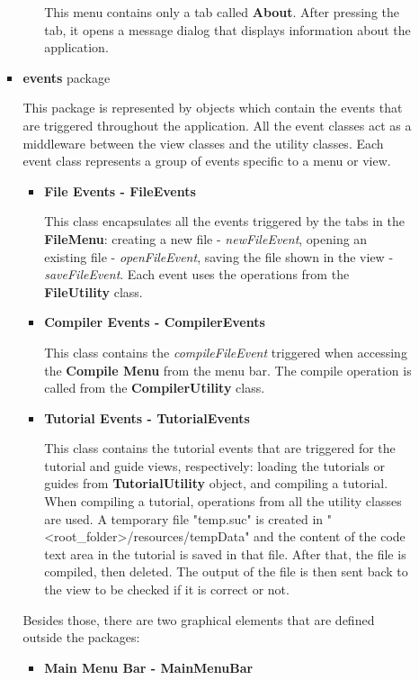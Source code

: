 \documentclass[12pt,a4paper,twoside]{report}
\begin{document}
\begin{enumerate}
\begin{itemize}
\begin{itemize}
\begin{enumerate}
	This menu contains only a tab called \textbf{About}. After pressing the tab, it opens a message dialog that displays information about the application.
	\end{enumerate}
	
	\item \textbf{events} package
	
	This package is represented by objects which contain the events that are triggered throughout the application. All the event classes act as a middleware between the view classes and the utility classes. Each event class represents a group of events specific to a menu or view.
	
	\begin{itemize}
		\item \textbf{File Events - FileEvents}
		
		This class encapsulates all the events triggered by the tabs in the \textbf{FileMenu}: creating a new file - \textit{newFileEvent}, opening an existing file - \textit{openFileEvent}, saving the file shown in the view - \textit{saveFileEvent}. Each event uses the operations from the \textbf{FileUtility} class. 
		
		\item \textbf{Compiler Events - CompilerEvents}
		
		This class contains the \textit{compileFileEvent} triggered when accessing the \textbf{Compile Menu} from the menu bar. The compile operation is called from the \textbf{CompilerUtility} class. 
		
		\item \textbf{Tutorial Events - TutorialEvents}
		
		This class contains the tutorial events that are triggered for the tutorial and guide views, respectively: loading the tutorials or guides from \textbf{TutorialUtility} object, and compiling a tutorial. When compiling a tutorial, operations from all the utility classes are used. A temporary file "temp.suc" is created in "<root\_folder>/resources/tempData" and the content of the code text area in the tutorial is saved in that file. After that, the file is compiled, then deleted. The output of the file is then sent back to the view to be checked if it is correct or not.
	\end{itemize}


Besides those, there are two graphical elements that are defined outside the packages:
\begin{itemize}
\item \textbf{Main Menu Bar - MainMenuBar}
	

\end{itemize}
\end{itemize}
\end{itemize}
\end{enumerate}
\end{document}
